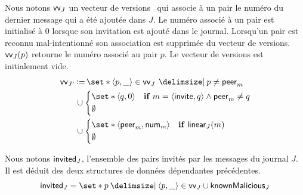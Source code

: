 Nous notons $\operatorname{\mathsf{vv}}_J$ un vecteur de versions~\autocite{parker_1983_versionvector,mattern_1988_timevector} qui associe à un pair le numéro du dernier message qui a été ajoutée dans $J$.
Le numéro associé à un pair est initialisé à $0$ lorsque son invitation est ajouté dans le journal.
Lorsqu'un pair est reconnu mal-intentionné son association est supprimée du vecteur de versions.
$\operatorname{\mathsf{vv}}_J(p)$ retourne le numéro associé au pair $p$.
Le vecteur de versions est initialement vide.
%
\begin{equation*}\begin{split}
\MoveEqLeft\trm{vv}_{J'} \assign \set*{\tuple{p, \_} \in \trm{vv}_J \given p \neq \trm{peer}_m}\\
&\cup \begin{dcases}
        \set*{\tuple{q, 0}} & \when m = \tuple{\trm{invite}, q} \land \trm{peer}_m \neq q\\
        \emptyset &
    \end{dcases}\\
&\cup \begin{dcases}
        \set*{\tuple{\trm{peer}_m, \trm{num}_m}} & \when \trm{linear}_J(m)\\
        \emptyset &
    \end{dcases}
\end{split}\end{equation*}

Nous notons $\operatorname{\mathsf{invited}}_J$, l'ensemble des pairs invités par les messages du journal $J$.
Il est déduit des deux structures de données dépendantes précédentes.
%
\begin{equation*}
    \trm{invited}_{J} = \set*{p \given \tuple{p, \_} \in \trm{vv}_J} \cup \trm{knownMalicious}_J
\end{equation*}


